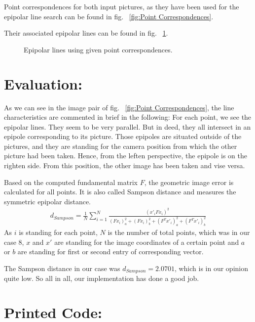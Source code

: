 \documentclass[a4paper,headings=small]{scrartcl}
\numberwithin{equation}{section} %
\numberwithin{figure}{section}   %
\newcommand{\generatedImgRootTarget}{../../../target}
\begin{document}
Point correspondences for both input pictures, 
as they have been used for the epipolar line search 
can be found in fig. ~\ref{fig:Point Correspondences}.

Their associated epipolar lines can be found in fig. ~\ref{fig:Epipolar Lines}.
\begin{figure}
   \hfill
  \caption{Epipolar lines using given point correspondences.}
  \label{fig:Epipolar Lines}
\end{figure}
\section{Evaluation:}
As we can see in the image pair of fig. ~\ref{fig:Point Correspondences},
the line characteristics are commented in brief in the following:
For each point, we see the epipolar lines. They seem to be very parallel.
But in deed, they all intersect in an epipole corresponding to its picture.
Those epipoles are situated outside of the pictures, and they are standing
for the camera position from which the other picture had been taken.
Hence, from the leften perspective, the epipole is on the righten side.
From this position, the other image has been taken and vise versa.

Based on the computed fundamental matrix $F$, the geometric image error
is calculated for all points. It is also called Sampson distance
and measures the symmetric epipolar distance.
\begin{align}
  d_{Sampson} = \frac{1}{N} \sum_{i=1}^N \frac{(x'_i F x_i)^2}{(F x_i)_a^2 + (F x_i)_b^2 + (F^T x'_i)_a^2 + (F^T x'_i)_b^2}
\end{align}
As $i$ is standing for each point, $N$ is the number of total points, 
which was in our case 8, $x$ and $x'$ are standing for the image coordinates of a certain
point and $a$ or $b$ are standing for first or second entry of corresponding vector.

The Sampson distance in our case was $d_{Sampson}=2.0701$, which is in our opinion quite low.
So all in all, our implementation has done a good job.
\section{Printed Code:}


\end{document}
